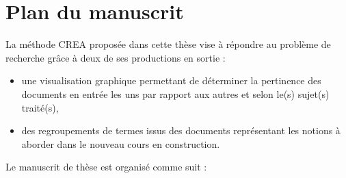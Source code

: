 
\clearpage %
\newpage   %



\section{Plan du manuscrit}
\label{section:Introduction:PlanManuscrit}


La méthode CREA proposée dans cette thèse vise à répondre au problème de recherche grâce à deux de ses productions en sortie :

\begin{itemize}
\item une visualisation graphique permettant de déterminer la pertinence des documents en entrée les uns par rapport aux autres et selon le(s) sujet(s) traité(s),

\item des regroupements de termes issus des documents représentant les notions à aborder dans le nouveau cours en construction.
\end{itemize}


\bigskip
\vspace*{2cm}


Le manuscrit de thèse est organisé comme suit :

